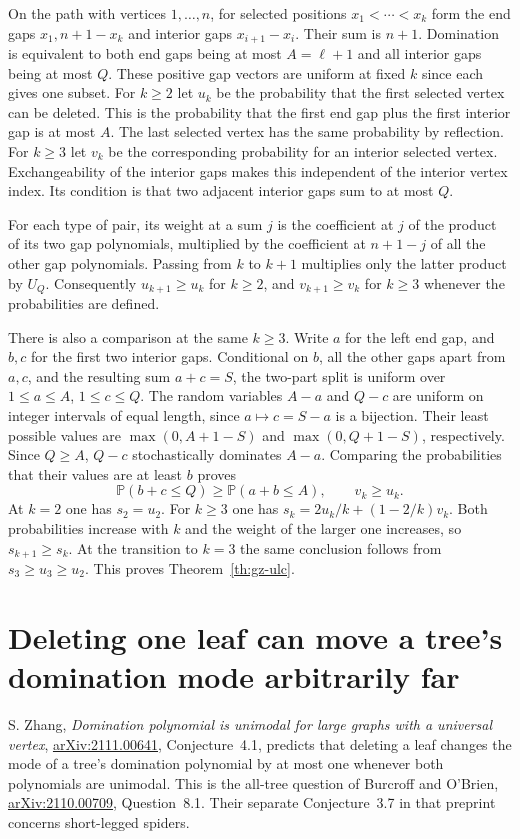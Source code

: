 \documentclass[11pt,a4paper]{article}
\numberwithin{equation}{section}
\begin{document}
On the path with vertices $1,\ldots,n$, for selected positions
$x_1<\cdots<x_k$ form the end gaps $x_1,n+1-x_k$ and interior gaps
$x_{i+1}-x_i$. Their sum is $n+1$. Domination is equivalent to both
end gaps being at most $A=\ell+1$ and all interior gaps being at most
$Q$. These positive gap vectors are uniform at fixed $k$ since each
gives one subset. For $k\ge2$ let $u_k$ be the probability that the
first selected vertex can be deleted. This is the probability that
the first end gap plus the first interior gap is at most $A$. The
last selected vertex has the same probability by reflection. For
$k\ge3$ let $v_k$ be the corresponding probability for an interior
selected vertex. Exchangeability of the interior gaps makes this
independent of the interior vertex index. Its condition is that two
adjacent interior gaps sum to at most $Q$.

For each type of pair, its weight at a sum $j$ is the coefficient at
$j$ of the product of its two gap polynomials, multiplied by the
coefficient at $n+1-j$ of all the other gap polynomials. Passing from
$k$ to $k+1$ multiplies only the latter product by $U_Q$.
Consequently $u_{k+1}\ge u_k$ for $k\ge2$, and $v_{k+1}\ge v_k$ for
$k\ge3$ whenever the probabilities are defined.

There is also a comparison at the same $k\ge3$. Write $a$ for the
left end gap, and $b,c$ for the first two interior gaps. Conditional
on $b$, all the other gaps apart from $a,c$, and the resulting sum
$a+c=S$, the two-part split is uniform over $1\le a\le A$,
$1\le c\le Q$. The random variables $A-a$ and $Q-c$ are uniform on
integer intervals of equal length, since $a\mapsto c=S-a$ is a
bijection. Their least possible values are
$\max(0,A+1-S)$ and $\max(0,Q+1-S)$, respectively. Since $Q\ge A$,
$Q-c$ stochastically dominates $A-a$. Comparing the probabilities
that their values are at least $b$ proves
\[
 \mathbb P(b+c\le Q)\ge\mathbb P(a+b\le A),\qquad v_k\ge u_k .
\]
At $k=2$ one has $s_2=u_2$. For $k\ge3$ one has
$s_k=2u_k/k+(1-2/k)v_k$. Both probabilities increase with $k$ and
the weight of the larger one increases, so $s_{k+1}\ge s_k$.
At the transition to $k=3$ the same conclusion follows from
$s_3\ge u_3\ge u_2$. This proves Theorem~\ref{th:gz-ulc}.

\section{Deleting one leaf can move a tree's domination mode arbitrarily far}
\label{sec:tree-leaf-mode}
S. Zhang, \emph{Domination polynomial is unimodal for large graphs
with a universal vertex}, \href{https://arxiv.org/abs/2111.00641}{arXiv:2111.00641},
Conjecture~4.1, predicts that deleting a leaf changes the mode of a
tree's domination polynomial by at most one whenever both polynomials
are unimodal. This is the all-tree question of Burcroff and O'Brien,
\href{https://arxiv.org/abs/2110.00709}{arXiv:2110.00709}, Question~8.1.
Their separate Conjecture~3.7 in that preprint concerns short-legged
spiders.
\end{document}
